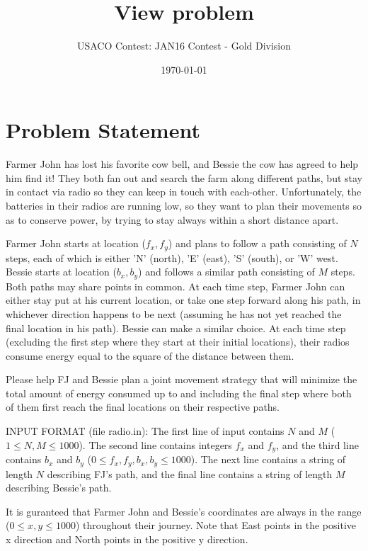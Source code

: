\documentclass[12pt]{article}
\title{View problem}
\author{USACO Contest: JAN16 Contest - Gold Division}
\date{\today}
\begin{document}
\maketitle

\section*{Problem Statement}

Farmer John has lost his favorite cow bell, and Bessie the cow has agreed to
help him find it!  They both fan out and search the farm along different paths,
but stay in contact via radio so they can keep in touch with each-other.
Unfortunately, the batteries in their radios are running low, so they want to
plan their movements so as to conserve power, by trying to stay always within a
short distance apart.

Farmer John starts at location ($f_x, f_y$) and plans to follow a path
consisting of  $N$ steps, each of which is either 'N' (north), 'E' (east), 'S'
(south), or 'W' west.  Bessie starts at location ($b_x, b_y$) and follows a
similar path consisting of $M$ steps.  Both paths may share points in common. 
At each time step, Farmer John can either stay put at his current location, or
take one step forward along his path, in whichever direction happens to be next
(assuming he has not yet reached the final location in his path). Bessie can
make a similar choice.  At each time step (excluding the first step where they
start at their initial locations), their radios consume energy equal to the
square of the distance between them.  

Please help FJ and Bessie plan a joint movement strategy that will minimize the
total amount of energy consumed up to and including the final step where both of
them first reach the final locations on their respective paths.

INPUT FORMAT (file radio.in):
The first line of input contains $N$ and $M$ ($1 \leq N, M \leq 1000$).   The
second line contains integers $f_x$ and $f_y$, and the third line contains $b_x$
and $b_y$ ($0 \leq f_x, f_y, b_x, b_y \leq 1000$). The next line contains  a
string of length $N$ describing FJ's path, and the final line contains a string
of  length $M$ describing Bessie's path.

It is guranteed that Farmer John and Bessie's coordinates are always in the
range ($0 \leq x,y \leq 1000$) throughout their journey.  Note that East points in the positive x direction and North points in the positive y direction.
\end{document}
